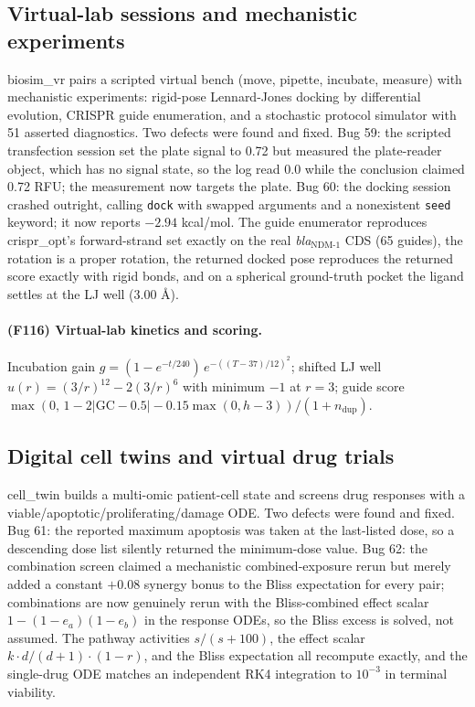 \subsection{Virtual-lab sessions and mechanistic experiments}
biosim\_vr pairs a scripted virtual bench (move, pipette, incubate, measure) with mechanistic experiments: rigid-pose Lennard-Jones docking by differential evolution, CRISPR guide enumeration, and a stochastic protocol simulator with 51 asserted diagnostics. Two defects were found and fixed. Bug 59: the scripted transfection session set the plate signal to 0.72 but measured the plate-reader object, which has no signal state, so the log read 0.0 while the conclusion claimed 0.72 RFU; the measurement now targets the plate. Bug 60: the docking session crashed outright, calling \texttt{dock} with swapped arguments and a nonexistent \texttt{seed} keyword; it now reports $-2.94$ kcal/mol. The guide enumerator reproduces crispr\_opt's forward-strand set exactly on the real \emph{bla}$_{\mathrm{NDM\text{-}1}}$ CDS (65 guides), the rotation is a proper rotation, the returned docked pose reproduces the returned score exactly with rigid bonds, and on a spherical ground-truth pocket the ligand settles at the LJ well (3.00 \AA).
\paragraph{(F116) Virtual-lab kinetics and scoring.} Incubation gain $g=(1-e^{-t/240})\,e^{-((T-37)/12)^2}$; shifted LJ well $u(r)=(3/r)^{12}-2(3/r)^{6}$ with minimum $-1$ at $r=3$; guide score $\max(0,\,1-2|\mathrm{GC}-0.5|-0.15\max(0,h-3))/(1+n_{\mathrm{dup}})$.
\subsection{Digital cell twins and virtual drug trials}
cell\_twin builds a multi-omic patient-cell state and screens drug responses with a viable/apoptotic/proliferating/damage ODE. Two defects were found and fixed. Bug 61: the reported maximum apoptosis was taken at the last-listed dose, so a descending dose list silently returned the minimum-dose value. Bug 62: the combination screen claimed a mechanistic combined-exposure rerun but merely added a constant $+0.08$ synergy bonus to the Bliss expectation for every pair; combinations are now genuinely rerun with the Bliss-combined effect scalar $1-(1-e_a)(1-e_b)$ in the response ODEs, so the Bliss excess is solved, not assumed. The pathway activities $s/(s+100)$, the effect scalar $k\cdot d/(d+1)\cdot(1-r)$, and the Bliss expectation all recompute exactly, and the single-drug ODE matches an independent RK4 integration to $10^{-3}$ in terminal viability.
